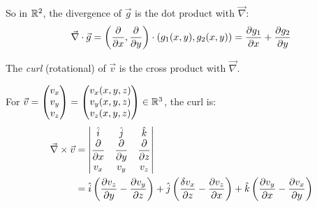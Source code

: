 \documentclass[twoside]{scrartcl}
\begin{document}
So in $\mathbb{R}^2$, the divergence of $\vec{g}$ is the dot product with $\vec{\nabla}$:
\[\vec{\nabla}\cdot\vec{g} = \left(\frac{\partial}{\partial x}, \frac{\partial}{\partial y}\right) \cdot(g_1(x,y),g_2(x,y)) = \frac{\partial g_1}{\partial x} + \frac{\partial g_2}{\partial y}\]

\begin{definition}
The \emph{curl} (rotational) of $\vec{v}$ is the cross product with $\vec{\nabla}$. 
	
For $\vec{v} = \begin{pmatrix}
 v_x \\ v_y \\ v_z	
 \end{pmatrix}
 = \begin{pmatrix}
 v_x(x,y,z)\\ v_y(x,y,z) \\ v_z(x,y,z)	
 \end{pmatrix}
 \in\mathbb{R}^3$, the curl is:\\
 
\[\begin{aligned}
\vec{\nabla} \times \vec{v} &= \begin{vmatrix}
 \hat{i} & \hat{j} & \hat{k}\\
 \dfrac{\partial}{\partial x} & \dfrac{\partial}{\partial y} & \dfrac{\partial}{\partial z}\\
 v_x & v_y & v_z
 \end{vmatrix}\\
	&= \hat{i}\left(\frac{\partial v_z}{\partial y} - \frac{\partial v_y}{\partial z}\right)
	+ \hat{j}\left(\frac{\delta v_x}{\partial z} - \frac{\partial v_z}{\partial x}\right)
	+ \hat{k}\left(\frac{\partial v_y}{\partial x} - \frac{\partial v_x}{\partial y}\right)
\end{aligned}
\]
\end{definition}~
\end{document}
